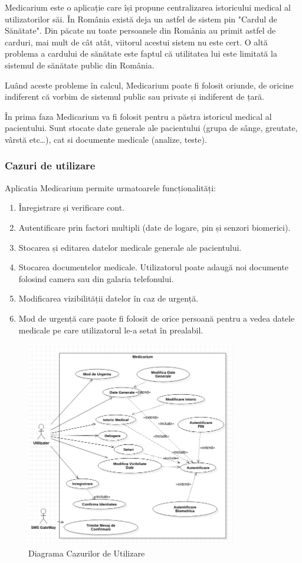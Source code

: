\documentclass[12pt]{article}
\begin{document}
Medicarium este o aplicație care își propune centralizarea istoricului medical al utilizatorilor săi.
În România există deja un astfel de sistem pin "Cardul de Sănătate". Din păcate nu toate persoanele din România 
au primit astfel de carduri, mai mult de cât atât, viitorul acestui sistem nu este cert. O altă problema a cardului
de sănătate este faptul că utilitatea lui este limitată la sistemul de sănătate public
din România.

Luând aceste probleme în calcul, Medicarium poate fi folosit oriunde, de oricine indiferent
că vorbim de sistemul public sau private și indiferent de țară.

În prima faza Medicarium va fi folosit pentru a păstra istoricul medical al pacientului. 
Sunt stocate date generale ale pacientului (grupa de sânge, greutate, vârstă etc\dots), 
cat si documente medicale (analize, teste).

\newpage
\subsubsection{Cazuri de utilizare}

Aplicatia Medicarium permite urmatoarele funcționalități:

\begin{enumerate}
    \item Înregistrare și verificare cont.
    \item Autentificare prin factori multipli (date de logare, pin și senzori biomerici).
    \item Stocarea și editarea datelor medicale generale ale pacientului.
    \item Stocarea documentelor medicale. Utilizatorul poate adaugă noi documente 
    folosind camera sau din galaria telefonului.
    \item Modificarea vizibilității datelor în caz de urgență.
    \item Mod de urgență care paote fi folosit de orice persoană pentru a vedea
    datele medicale pe care utilizatorul le-a setat în prealabil. 
\end{enumerate}


\begin{figure}[H]
\centering
\includegraphics[height=9cm]{cazuri.png}
\caption{Diagrama Cazurilor de Utilizare}
\end{figure}
\end{document}
